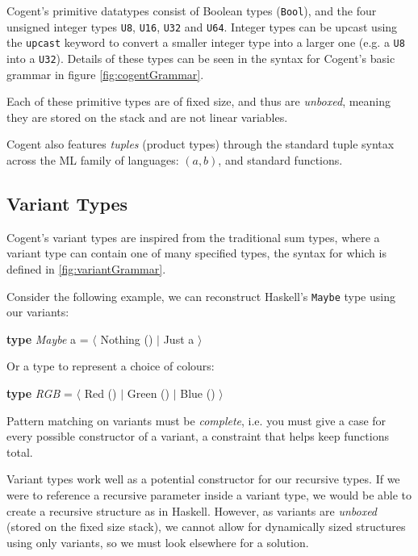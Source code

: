 Cogent's primitive datatypes consist of Boolean types (\texttt{Bool}), and the four unsigned integer types \texttt{U8}, 
\texttt{U16}, \texttt{U32} and \texttt{U64}. Integer types can be upcast using the \texttt{\textsf{upcast}}
keyword to convert a smaller integer type into a larger one (e.g. a \texttt{U8} into a \texttt{U32}).
Details of these types can be seen in the syntax for Cogent's basic grammar in figure \ref{fig:cogentGrammar}.

Each of these primitive types are of fixed size, and thus are \emph{unboxed}, meaning they are stored on the
stack and are not linear variables.

Cogent also features \emph{tuples} (product types) through the standard tuple syntax across the ML
family of languages: $(a,b)$, and standard functions.

\subsection{Variant Types}

Cogent's variant types are inspired from the traditional sum types, where a variant type can contain
one of many specified types, the syntax for which is defined in \autoref{fig:variantGrammar}.

Consider the following example, we can reconstruct Haskell's \texttt{Maybe} type using our variants:

\begin{center}
    \textbf{type} \textit{Maybe} a = $\langle$ Nothing () $\vert$ Just a $\rangle$
\end{center}

Or a type to represent a choice of colours:

\begin{center}
    \textbf{type} \textit{RGB} = $\langle$ Red () $\vert$ Green () $\vert$ Blue () $\rangle$
\end{center}

Pattern matching on variants must be \textit{complete}, i.e. you must give a case for every possible constructor
of a variant, a constraint that helps keep functions total.

Variant types work well as a potential constructor for our recursive types. If we were to reference a
recursive parameter inside a variant type, we would be able to create a recursive structure as in Haskell.
However, as variants are \textit{unboxed} (stored on the fixed size stack), we cannot allow for dynamically sized structures
using only variants, so we must look elsewhere for a solution.

